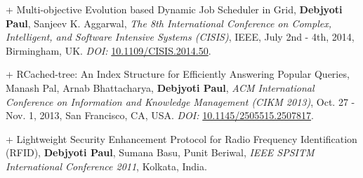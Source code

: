 \documentclass[8pt]{article}
\makeatletter
\newlength{\bibhang}
\newlength{\bibsep}
 {\@listi \global\bibsep\itemsep \global\advance\bibsep by\parsep}
\newenvironment{bibsection}%
        {\vspace{-\baselineskip}\begin{list}{}{%
       \setlength{\leftmargin}{\bibhang}%
       \setlength{\itemindent}{-\leftmargin}%
       \setlength{\itemsep}{\bibsep}%
       \setlength{\parsep}{\z@}%
        \setlength{\partopsep}{0pt}%
        \setlength{\topsep}{0pt}}}
        {\end{list}\vspace{-.6\baselineskip}}
\renewcommand{\section}[2]%
        {\pagebreak[2]\vspace{0.7\baselineskip}%
         \phantomsection\addcontentsline{toc}{section}{#1}%
         \hspace{0in}%
         \marginpar{
         \raggedright \scshape #1}#2}
\newenvironment{innerlist}[1][\enskip\textbullet]%
        {\begin{compactitem}[#1]}{\end{compactitem}}
\makeatother
\begin{document}
\begin{bibsection}
\item[+] Multi-objective Evolution based Dynamic Job Scheduler in Grid, \textbf{Debjyoti Paul}, Sanjeev K. Aggarwal,  \emph{The 8th International Conference on Complex, Intelligent, and Software Intensive Systems (CISIS)}, IEEE, July 2nd - 4th, 2014, Birmingham, UK. \textit{DOI:} \href{https://dx.doi.org/10.1109/CISIS.2014.50}{10.1109/CISIS.2014.50}.
\item[+] RCached-tree: An Index Structure for Efficiently Answering Popular Queries, Manash Pal, Arnab Bhattacharya, \textbf{Debjyoti Paul}, \emph{ACM International Conference on Information and Knowledge Management (CIKM 2013)}, Oct. 27 - Nov. 1, 2013, San Francisco, CA, USA. \textit{DOI:}  \href{https://dx.doi.org/10.1145/2505515.2507817}{10.1145/2505515.2507817}.
\item[+] Lightweight Security Enhancement Protocol for Radio Frequency Identification (RFID),  \textbf{Debjyoti Paul}, Sumana Basu, Punit Beriwal, \emph{IEEE SPSITM International Conference 2011}, Kolkata, India.
\end{bibsection}




\end{document}
